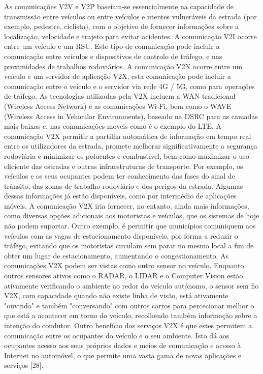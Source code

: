 \documentclass[a4paper,10pt]{texRel}
\begin{document}
As comunicações V2V e V2P baseiam-se essencialmente na capacidade de transmissão entre veículos ou entre veículos e utentes vulneráveis da estrada (por exemplo, pedestre, ciclista), com o objetivo de fornecer informações sobre a localização, velocidade e trajeto para evitar acidentes.  
A comunicação V2I ocorre entre um veículo e um RSU. Este tipo de comunicação pode incluir a comunicação entre veículos e dispositivos de controlo de tráfego, e nas proximidades de trabalhos rodoviários.
A comunicação V2N ocorre entre um veículo e um servidor de aplicação V2X, esta comunicação pode incluir a comunicação entre o veículo e o servidor via rede 4G / 5G, como para operações de tráfego.
As tecnologias utilizadas pela V2X incluem a WAN tradicional (Wireless Access Network) e as comunicações Wi-Fi, bem como o WAVE (Wireless Access in Vehicular Environments), baseado na DSRC para as camadas mais baixas e, nas comunicações moveis como é o exemplo do LTE.
A comunicação V2X permitir a partilha automática de informação em tempo real entre os utilizadores da estrada, promete melhorar significativamente a segurança rodoviária e minimizar os poluentes e combustível, bem como maximizar o uso eficiente das estradas e outras infraestruturas de transporte.
Por exemplo, os veículos e os seus ocupantes podem ter conhecimento das fases do sinal de trânsito, das zonas de trabalho rodoviário e dos perigos da estrada. Algumas dessas informações já estão disponíveis, como por intermédio de aplicações móveis. A comunicação V2X iria fornecer, no entanto, ainda mais informações, como diversas opções adicionais aos motoristas e veículos, que os sistemas de hoje não podem suportar. Outro exemplo, é permitir que municípios comuniquem aos veículos com as vagas de estacionamento disponíveis, por forma a reduzir o tráfego, evitando que os motoristas circulam sem parar no mesmo local a fim de obter um lugar de estacionamento, aumentando o congestionamento.
As comunicações V2X podem ser vistas como outro sensor no veículo. Enquanto outros sensores ativos como o RADAR, o LIDAR e o Computer Vision estão ativamente verificando o ambiente ao redor do veículo autónomo, o sensor sem fio V2X, com capacidade quando não existe linha de visão, está ativamente "ouvindo" e também "conversando" com outros carros para percecionar melhor o que está a acontecer em torno do veículo, recolhendo também informação sobre a intenção do condutor.
Outro benefício dos serviços V2X é que estes permitem a comunicação entre os ocupantes do veículo e o seu ambiente. Isto dá aos ocupantes acesso aos seus próprios dados e meios de comunicação e acesso à Internet no automóvel, o que permite uma vasta gama de novas aplicações e serviços [28].
\end{document}
